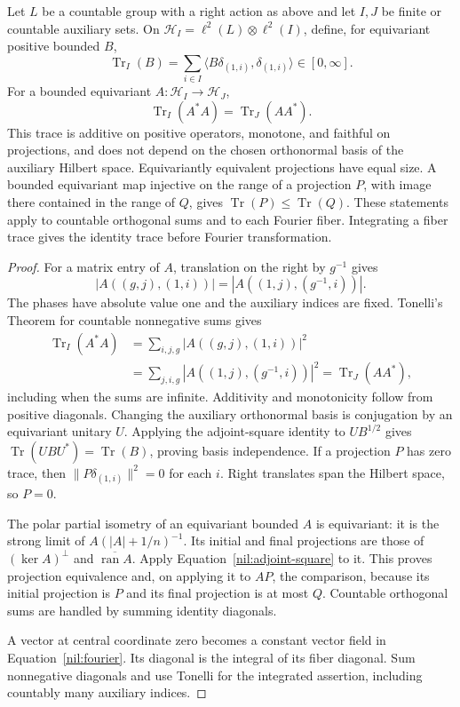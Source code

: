 \begin{lemma}\label{nil:trace}
Let \(L\) be a countable group with a right action as above and let
\(I,J\) be finite or countable auxiliary sets. On
\(\mathcal H_I=\ell^2(L)\otimes\ell^2(I)\), define, for equivariant
positive bounded \(B\),
\[
 \operatorname{Tr}_I(B)
   =\sum_{i\in I}\langle B\delta_{(1,i)},\delta_{(1,i)}\rangle
       \in[0,\infty].
\]
For a bounded equivariant \(A:\mathcal H_I\to\mathcal H_J\),
\begin{equation}\label{nil:adjoint-square}
 \operatorname{Tr}_I(A^*A)=\operatorname{Tr}_J(AA^*).
\end{equation}
This trace is additive on positive operators, monotone, and
faithful on projections, and does not depend on the chosen
orthonormal basis of the auxiliary Hilbert space.
Equivariantly equivalent projections
have equal size. A bounded equivariant map injective on the
range of a projection \(P\), with image there contained in the
range of \(Q\), gives \(\operatorname{Tr}(P)\le\operatorname{Tr}(Q)\).
These statements apply to countable orthogonal sums and to each
Fourier fiber. Integrating a fiber trace gives the identity trace
before Fourier transformation.
\end{lemma}

\begin{proof}
For a matrix entry of \(A\), translation on the right by \(g^{-1}\)
gives
\[
 |A((g,j),(1,i))|=|A((1,j),(g^{-1},i))|.
\]
The phases have absolute value one and the auxiliary indices
are fixed. Tonelli's Theorem for countable nonnegative sums gives
\begin{align*}
 \operatorname{Tr}_I(A^*A)
 &=\sum_{i,j,g}|A((g,j),(1,i))|^2\\
 &=\sum_{j,i,g}|A((1,j),(g^{-1},i))|^2
  =\operatorname{Tr}_J(AA^*),
\end{align*}
including when the sums are infinite.
Additivity and monotonicity follow from positive diagonals.
Changing the auxiliary orthonormal basis is conjugation by an
equivariant unitary \(U\). Applying the adjoint-square identity
to \(UB^{1/2}\) gives
\(\operatorname{Tr}(UBU^*)=\operatorname{Tr}(B)\), proving
basis independence.
If a projection \(P\) has zero trace, then
\(\|P\delta_{(1,i)}\|^2=0\) for each \(i\).
Right translates span the Hilbert space, so \(P=0\).

The polar partial isometry of an equivariant bounded \(A\) is
equivariant: it is the strong limit of
\(A(|A|+1/n)^{-1}\). Its initial and final projections are those
of \((\ker A)^\perp\) and \(\overline{\operatorname{ran}A}\).
Apply Equation~\ref{nil:adjoint-square} to it. This proves
projection equivalence and, on applying it to \(AP\), the
comparison, because its initial projection is \(P\) and its
final projection is at most \(Q\). Countable orthogonal sums
are handled by summing identity diagonals.

A vector at central coordinate zero becomes a constant vector
field in Equation~\ref{nil:fourier}. Its diagonal is the integral
of its fiber diagonal. Sum nonnegative diagonals and use Tonelli
for the integrated assertion, including countably many
auxiliary indices.
\end{proof}

